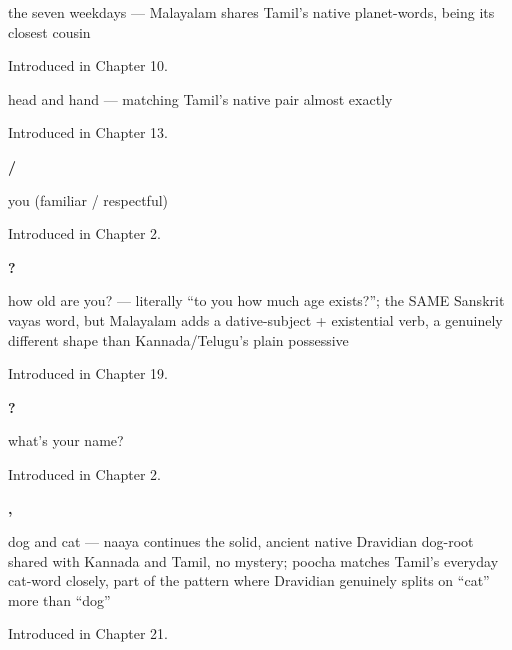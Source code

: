 \noindent\begin{minipage}[t]{\linewidth}
\raggedright
\textbf{      }\par
\small the seven weekdays — Malayalam shares Tamil's native planet-words, being its closest cousin\par
\footnotesize Introduced in Chapter 10.
\end{minipage}\par\medskip

\noindent\begin{minipage}[t]{\linewidth}
\raggedright
\textbf{ }\par
\small head and hand — matching Tamil's native pair almost exactly\par
\footnotesize Introduced in Chapter 13.
\end{minipage}\par\medskip

\noindent\begin{minipage}[t]{\linewidth}
\raggedright
\textbf{ / }\par
\small you (familiar / respectful)\par
\footnotesize Introduced in Chapter 2.
\end{minipage}\par\medskip

\noindent\begin{minipage}[t]{\linewidth}
\raggedright
\textbf{  ?}\par
\small how old are you? — literally \textquotedblleft{}to you how much age exists?\textquotedblright{}; the SAME Sanskrit vayas word, but Malayalam adds a dative-subject + existential verb, a genuinely different shape than Kannada/Telugu's plain possessive\par
\footnotesize Introduced in Chapter 19.
\end{minipage}\par\medskip

\noindent\begin{minipage}[t]{\linewidth}
\raggedright
\textbf{  ?}\par
\small what's your name?\par
\footnotesize Introduced in Chapter 2.
\end{minipage}\par\medskip

\noindent\begin{minipage}[t]{\linewidth}
\raggedright
\textbf{, }\par
\small dog and cat — naaya continues the solid, ancient native Dravidian dog-root shared with Kannada and Tamil, no mystery; poocha matches Tamil's everyday cat-word closely, part of the pattern where Dravidian genuinely splits on \textquotedblleft{}cat\textquotedblright{} more than \textquotedblleft{}dog\textquotedblright{}\par
\footnotesize Introduced in Chapter 21.
\end{minipage}\par\medskip


